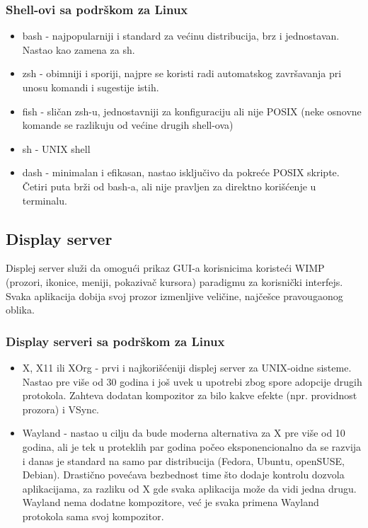 \documentclass[a4paper,14pt]{article}
\begin{document}
\subsubsection{Shell-ovi sa podrškom za Linux}
\begin{itemize}
\item bash - najpopularniji i standard za većinu distribucija, brz i jednostavan. Nastao kao zamena za sh.
\item zsh - obimniji i sporiji, najpre se koristi radi automatskog završavanja pri unosu komandi i sugestije istih.
\item fish - sličan zsh-u, jednostavniji za konfiguraciju ali nije POSIX (neke osnovne komande se razlikuju od većine drugih shell-ova)
\item sh - UNIX shell
\item dash - minimalan i efikasan, nastao isključivo da pokreće POSIX skripte. Četiri puta brži od bash-a, ali nije pravljen za direktno korišćenje u terminalu.
\end{itemize}

\subsection{Display server}
Displej server služi da omogući prikaz GUI-a korisnicima koristeći WIMP (prozori, ikonice, meniji, pokazivač kursora) paradigmu za korisnički interfejs. Svaka aplikacija dobija svoj prozor izmenljive veličine, najčešce pravougaonog oblika.
\subsubsection{Display serveri sa podrškom za Linux}
\begin{itemize}
\item X, X11 ili XOrg - prvi i najkorišćeniji displej server za UNIX-oidne sisteme. Nastao pre više od 30 godina i još uvek u upotrebi zbog spore adopcije drugih protokola. Zahteva dodatan kompozitor za bilo kakve efekte (npr. providnost prozora) i VSync.
\item Wayland - nastao u cilju da bude moderna alternativa za X pre više od 10 godina, ali je tek u proteklih par godina počeo eksponencionalno da se razvija i danas je standard na samo par distribucija (Fedora, Ubuntu, openSUSE, Debian). Drastično povećava bezbednost time što dodaje kontrolu dozvola aplikacijama, za razliku od X gde svaka aplikacija može da vidi jedna drugu. Wayland nema dodatne kompozitore, već je svaka primena Wayland protokola sama svoj kompozitor.
\end{itemize}
\newpage
\end{document}
